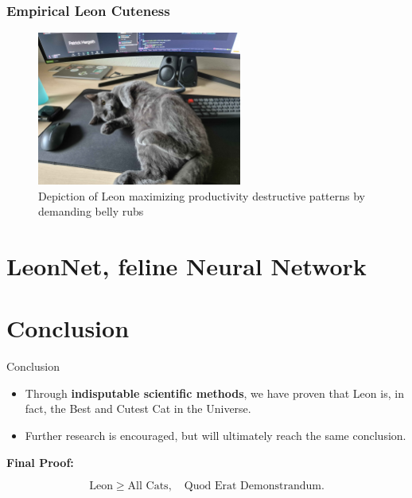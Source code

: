\documentclass[compress]{beamer}
\begin{document}
\begin{frame}
\frametitle{Empirical Leon Cuteness}
\begin{center}
  \begin{figure}[h]
    \includegraphics[width=0.6\textwidth]{images/keyboard_leon.jpg} %
\caption{Depiction of Leon maximizing productivity destructive patterns by demanding belly rubs}
\label{fig:egypt_cat} %
  \end{figure}  

\end{center}
\end{frame}

\section{LeonNet, feline Neural Network}

\section{Conclusion}
\begin{frame}{Conclusion}
    \begin{itemize}
        \item Through \textbf{indisputable scientific methods}, we have proven that Leon is, in fact, the Best and Cutest Cat in the Universe.
        \item Further research is encouraged, but will ultimately reach the same conclusion.
    \end{itemize}

    \textbf{Final Proof:}

    \begin{equation}
        \text{Leon} \geq \text{All Cats}, \quad \text{Quod Erat Demonstrandum.}
    \end{equation}
\end{frame}
\end{document}
